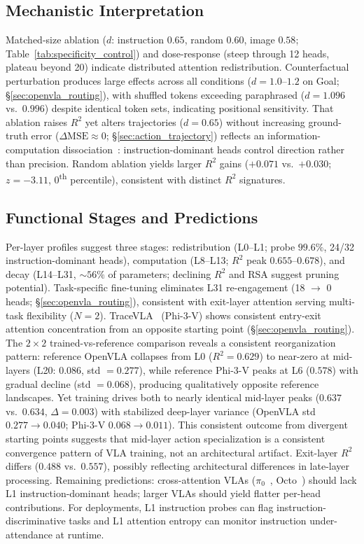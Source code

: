 \subsection{Mechanistic Interpretation}
Matched-size ablation ($d$: instruction $0.65$, random $0.60$, image $0.58$; Table~\ref{tab:specificity_control}) and dose-response (steep through 12 heads, plateau beyond 20) indicate distributed attention redistribution.
Counterfactual perturbation produces large effects across all conditions ($d = 1.0$--$1.2$ on Goal; \S\ref{sec:openvla_routing}), with shuffled tokens exceeding paraphrased ($d = 1.096$ vs.\ $0.996$) despite identical token sets, indicating positional sensitivity.
That ablation raises $R^2$ yet alters trajectories ($d = 0.65$) without increasing ground-truth error ($\Delta\text{MSE} \approx 0$; \S\ref{sec:action_trajectory}) reflects an information-computation dissociation~\cite{hewitt2019control}: instruction-dominant heads control direction rather than precision. Random ablation yields larger $R^2$ gains ($+0.071$ vs.\ $+0.030$; $z = -3.11$, $0$\textsuperscript{th} percentile), consistent with distinct $R^2$ signatures.

\subsection{Functional Stages and Predictions}
Per-layer profiles suggest three stages: redistribution (L0--L1; probe $99.6\%$, 24/32 instruction-dominant heads), computation (L8--L13; $R^2$ peak $0.655$--$0.678$), and decay (L14--L31, ${\sim}56\%$ of parameters; declining $R^2$ and RSA suggest pruning potential).
Task-specific fine-tuning eliminates L31 re-engagement (18 $\to$ 0 heads; \S\ref{sec:openvla_routing}), consistent with exit-layer attention serving multi-task flexibility ($N{=}2$).
TraceVLA~\cite{zheng2024tracevla} (Phi-3-V) shows consistent entry-exit attention concentration from an opposite starting point (\S\ref{sec:openvla_routing}).
The $2 {\times} 2$ trained-vs-reference comparison reveals a consistent reorganization pattern: reference OpenVLA collapses from L0 ($R^2 = 0.629$) to near-zero at mid-layers (L20: $0.086$, std $= 0.277$), while reference Phi-3-V peaks at L6 ($0.578$) with gradual decline (std $= 0.068$), producing qualitatively opposite reference landscapes.
Yet training drives both to nearly identical mid-layer peaks ($0.637$ vs.\ $0.634$, $\Delta = 0.003$) with stabilized deep-layer variance (OpenVLA std $0.277 \to 0.040$; Phi-3-V $0.068 \to 0.011$).
This consistent outcome from divergent starting points suggests that mid-layer action specialization is a consistent convergence pattern of VLA training, not an architectural artifact.
Exit-layer $R^2$ differs ($0.488$ vs.\ $0.557$), possibly reflecting architectural differences in late-layer processing.
Remaining predictions: cross-attention VLAs ($\pi_0$~\cite{black2024_pi0}, Octo~\cite{ghosh2024_octo}) should lack L1 instruction-dominant heads; larger VLAs should yield flatter per-head contributions.
For deployments, L1 instruction probes can flag instruction-discriminative tasks and L1 attention entropy can monitor instruction under-attendance at runtime.

